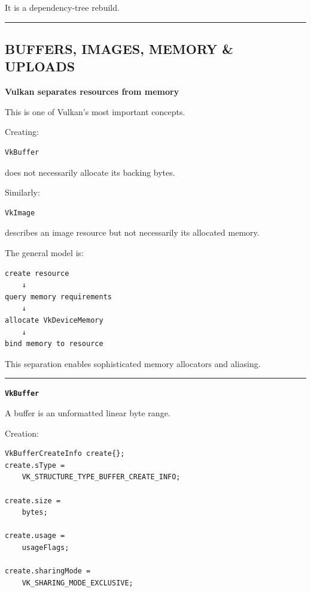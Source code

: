 It is a dependency-tree rebuild.

\begin{center}\rule{0.5\linewidth}{0.5pt}\end{center}

\subsection{BUFFERS, IMAGES, MEMORY \& UPLOADS}\label{01-foundations-i-ch013-buffers-images-memory-uploads}

\textbf{Vulkan separates resources from memory}

This is one of Vulkan's most important concepts.

Creating:

\begin{verbatim}
VkBuffer
\end{verbatim}

does not necessarily allocate its backing bytes.

Similarly:

\begin{verbatim}
VkImage
\end{verbatim}

describes an image resource but not necessarily its allocated memory.

The general model is:

\begin{verbatim}
create resource
    ↓
query memory requirements
    ↓
allocate VkDeviceMemory
    ↓
bind memory to resource
\end{verbatim}

This separation enables sophisticated memory allocators and aliasing.

\begin{center}\rule{0.5\linewidth}{0.5pt}\end{center}

\textbf{\texttt{VkBuffer}}

A buffer is an unformatted linear byte range.

Creation:

\begin{verbatim}
VkBufferCreateInfo create{};
create.sType =
    VK_STRUCTURE_TYPE_BUFFER_CREATE_INFO;

create.size =
    bytes;

create.usage =
    usageFlags;

create.sharingMode =
    VK_SHARING_MODE_EXCLUSIVE;
\end{verbatim}

